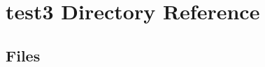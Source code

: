 \section{test3 Directory Reference}
\label{dir_d5777063fa38047b3eb00e2ee1038fc4}
\subsection*{Files}
\begin{DoxyCompactItemize}
\end{DoxyCompactItemize}
